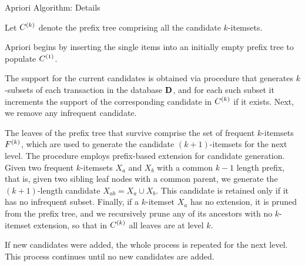 \begin{frame}{Apriori Algorithm: Details}
  \small 
  
  Let ${\relax C}^{(k)}$ denote the pref\/{i}x tree comprising all the
  candidate $k$-itemsets.  

\medskip
Apriori begins by inserting the single items into an initially
empty pref\/{i}x tree to populate ${\relax C}^{(1)}$.

\medskip   The
support for the current candidates is obtained via
\algcomputesupport procedure that generates $k$-subsets of each
transaction in the database $\mathbf{D}$, and for each such subset it
increments the support of the corresponding candidate in ${\relax C}^{(k)}$ if it
exists. Next, we remove any infrequent candidate.

\medskip
The leaves of the pref\/{i}x tree that survive comprise the set of
frequent $k$-itemsets ${\relax F}^{(k)}$, which are used to generate the candidate
$(k+1)$-itemsets for the next level. The \algextprefix procedure employs
pref\/{i}x-based extension for candidate generation. Given two frequent
$k$-itemsets $X_a$ and $X_b$ with a common $k-1$ length pref\/{i}x, that
is, given two sibling leaf nodes with a common parent, we generate the
$(k+1)$-length candidate $X_{ab} = X_a \cup X_b$.  This candidate is
retained only if it has no infrequent subset. F{i}nally, if a
$k$-itemset $X_a$ has no extension, it is pruned from the pref\/{i}x
tree, and we recursively prune any of its ancestors with no $k$-itemset
extension, so that in ${\relax C}^{(k)}$ all leaves are at level $k$.  

\medskip If new
candidates were added, the whole process is repeated for the next level.
This process continues until no new candidates are added.
\end{frame}



